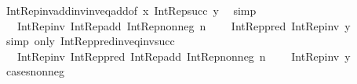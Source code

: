 \begin{isabellebody}
\ Int{\isacharunderscore}{\kern0pt}Rep{\isacharunderscore}{\kern0pt}inv{\isacharunderscore}{\kern0pt}add{\isacharunderscore}{\kern0pt}inv{\isacharunderscore}{\kern0pt}inv{\isacharunderscore}{\kern0pt}eq{\isacharunderscore}{\kern0pt}add{\isacharbrackleft}{\kern0pt}of\ x\ {\isachardoublequoteopen}Int{\isacharunderscore}{\kern0pt}Rep{\isacharunderscore}{\kern0pt}succ\ y{\isachardoublequoteclose}{\isacharbrackright}{\kern0pt}\ \isamarkupfalse%
\ simp\isanewline
\ \ \isamarkupfalse%
\ \isamarkupfalse%
\ {\isachardoublequoteopen}{\isachardot}{\kern0pt}{\isachardot}{\kern0pt}{\isachardot}{\kern0pt}\ {\isacharequal}{\kern0pt}\ Int{\isacharunderscore}{\kern0pt}Rep{\isacharunderscore}{\kern0pt}inv\ {\isacharparenleft}{\kern0pt}Int{\isacharunderscore}{\kern0pt}Rep{\isacharunderscore}{\kern0pt}add\ {\isacharparenleft}{\kern0pt}Int{\isacharunderscore}{\kern0pt}Rep{\isacharunderscore}{\kern0pt}nonneg\ n{\isacharparenright}{\kern0pt}\isanewline
\ \ \ \ {\isacharparenleft}{\kern0pt}Int{\isacharunderscore}{\kern0pt}Rep{\isacharunderscore}{\kern0pt}pred\ {\isacharparenleft}{\kern0pt}Int{\isacharunderscore}{\kern0pt}Rep{\isacharunderscore}{\kern0pt}inv\ y{\isacharparenright}{\kern0pt}{\isacharparenright}{\kern0pt}{\isacharparenright}{\kern0pt}{\isachardoublequoteclose}\isanewline
\ \ \ \ \isamarkupfalse%
\ {\isacharparenleft}{\kern0pt}simp\ only{\isacharcolon}{\kern0pt}\ Int{\isacharunderscore}{\kern0pt}Rep{\isacharunderscore}{\kern0pt}pred{\isacharunderscore}{\kern0pt}inv{\isacharunderscore}{\kern0pt}eq{\isacharunderscore}{\kern0pt}inv{\isacharunderscore}{\kern0pt}succ{\isacharparenright}{\kern0pt}\isanewline
\ \ \isamarkupfalse%
\ \isamarkupfalse%
\ {\isachardoublequoteopen}{\isachardot}{\kern0pt}{\isachardot}{\kern0pt}{\isachardot}{\kern0pt}\ {\isacharequal}{\kern0pt}\ Int{\isacharunderscore}{\kern0pt}Rep{\isacharunderscore}{\kern0pt}inv\ {\isacharparenleft}{\kern0pt}Int{\isacharunderscore}{\kern0pt}Rep{\isacharunderscore}{\kern0pt}pred\ {\isacharparenleft}{\kern0pt}Int{\isacharunderscore}{\kern0pt}Rep{\isacharunderscore}{\kern0pt}add\ {\isacharparenleft}{\kern0pt}Int{\isacharunderscore}{\kern0pt}Rep{\isacharunderscore}{\kern0pt}nonneg\ n{\isacharparenright}{\kern0pt}\isanewline
\ \ \ \ {\isacharparenleft}{\kern0pt}Int{\isacharunderscore}{\kern0pt}Rep{\isacharunderscore}{\kern0pt}inv\ y{\isacharparenright}{\kern0pt}{\isacharparenright}{\kern0pt}{\isacharparenright}{\kern0pt}{\isachardoublequoteclose}\isanewline
\ \ \ \ \isamarkupfalse%
\ cases{\isacharunderscore}{\kern0pt}nonneg\ \isamarkupfalse%

\end{isabellebody}
